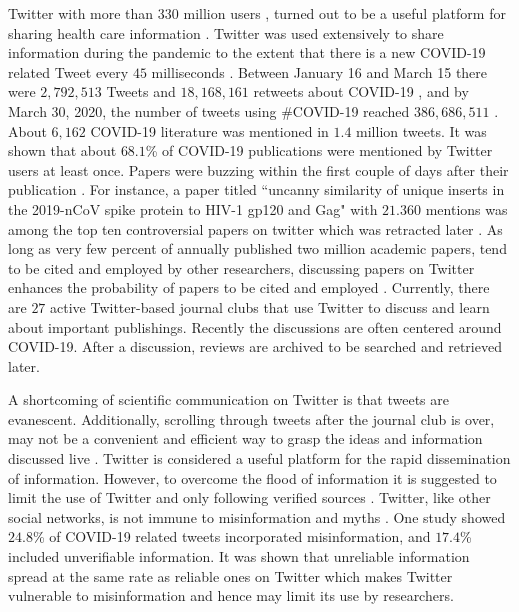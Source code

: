 \documentclass[acmsmall,authordraft]{acmart}
\begin{document}
Twitter with more than $330$ million users \citep{singh2020first}, turned out to be a useful platform for sharing health care information \citep{wilford2018social}. Twitter was used extensively to share information during the pandemic to the extent that there is a new COVID-19 related Tweet every $45$ milliseconds \citep{Josephson2020crisis}. Between January 16 and March 15 there were $2,792,513$ Tweets and $18,168,161$ retweets about COVID-19 \citep{singh2020first}, and by March 30, 2020, the number of tweets using \#COVID-19 reached $386,686,511$ \citep{rosenberg2020twitter}. 
About $6,162$ COVID-19 literature was mentioned in $1.4$ million tweets. It was shown that about $68.1$\% of COVID-19 publications were mentioned by Twitter users at least once. Papers were buzzing within the first couple of days after their publication \citep{eysenbach2011can}. For instance, a paper titled ``uncanny similarity of unique inserts in the 2019-nCoV spike protein to HIV-1 gp120 and Gag"  with $21.360$ mentions was among the top ten controversial papers on twitter which was retracted later \citep{fang2020tracking}. As long as very few percent of annually published two million academic papers, tend to be cited and employed by other researchers, discussing papers on Twitter enhances the probability of papers to be cited and employed \citep{o2020tweet}. Currently, there are $27$ active Twitter-based journal clubs that use Twitter to discuss and learn about important publishings.  Recently the discussions are often centered around COVID-19. After a discussion, reviews are archived to be searched and retrieved later. 

A shortcoming of scientific communication on Twitter is that tweets are evanescent. Additionally, scrolling through tweets after the journal club is over, may not be a convenient and efficient way to grasp the ideas and information discussed live \citep{stoneman2020twitter}. Twitter is considered a useful platform for the rapid dissemination of information. However, to overcome the flood of information it is suggested to limit the use of Twitter and only following verified sources \citep{rosenberg2020twitter}. Twitter, like other social networks, is not immune to misinformation and myths \citep{oyeyemi2014ebola, singh2020first}. One study showed $24.8$\% of COVID-19 related tweets incorporated misinformation, and $17.4$\% included unverifiable information\citep{kouzy2020coronavirus}. It was shown that unreliable information spread at the same rate as reliable ones on Twitter \citep{cinelli2020covid} which makes Twitter vulnerable to misinformation and hence may limit its use by researchers.
\end{document}
